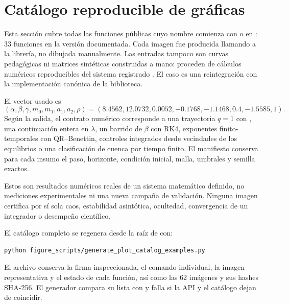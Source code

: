 \section{Catálogo reproducible de gráficas}
\label{sec:catalogo-graficas}

Esta sección cubre todas las funciones públicas cuyo nombre comienza con
 o  en
: 33 funciones en la versión documentada.
Cada imagen fue producida llamando a la librería, no dibujada manualmente. Las
entradas tampoco son curvas pedagógicas ni matrices sintéticas construidas a
mano: proceden de cálculos numéricos reproducibles del sistema registrado
. El caso
 es una reintegración
con la implementación canónica de la biblioteca.

El vector usado es
\[
(\alpha,\beta,\gamma,m_0,m_1,a_1,a_2,\rho)=
(8.4562,12.0732,0.0052,-0.1768,-1.1468,0.4,-1.5585,1).
\]
Según la salida, el contrato numérico corresponde a una trayectoria
\(q=1\) con , una continuación entera en \(\lambda\), un
barrido de \(\beta\) con RK4, exponentes finito-temporales con QR--Benettin,
controles integrados desde vecindades de los equilibrios o una clasificación
de cuenca por tiempo finito. El manifiesto conserva para cada insumo el paso,
horizonte, condición inicial, malla, umbrales y semilla exactos.

Estos son resultados numéricos reales de un sistema matemático definido, no
mediciones experimentales ni una nueva campaña de validación. Ninguna imagen
certifica por sí sola caos, estabilidad asintótica, ocultedad, convergencia de
un integrador o desempeño científico.

El catálogo completo se regenera desde la raíz de  con:
\begin{verbatim}
python figure_scripts/generate_plot_catalog_examples.py
\end{verbatim}
El archivo
 conserva
la firma inspeccionada, el comando individual, la imagen representativa y el
estado de cada función, así como las 62 imágenes y sus hashes SHA-256. El
generador compara su lista con
 y falla si la API y el catálogo
dejan de coincidir.

